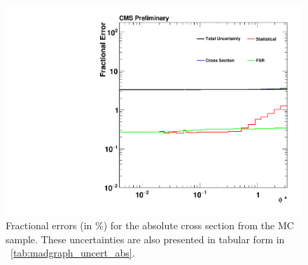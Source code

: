 \begin{figure}[!htbp]
    \centering
    \includegraphics[width=\textwidth]{figures/madgraph_uncertainty_absolute.pdf}
    \caption[
        Fractional errors (in \%) for the absolute cross section from the
        \MADGRAPH MC sample.
    ]{
        Fractional errors (in \%) for the absolute cross section from the
        \MADGRAPH MC sample. These uncertainties are also presented in tabular
        form in \TAB~\ref{tab:madgraph_uncert_abs}.
    }
    \label{fig:madgraph_uncert_abs}
\end{figure}
